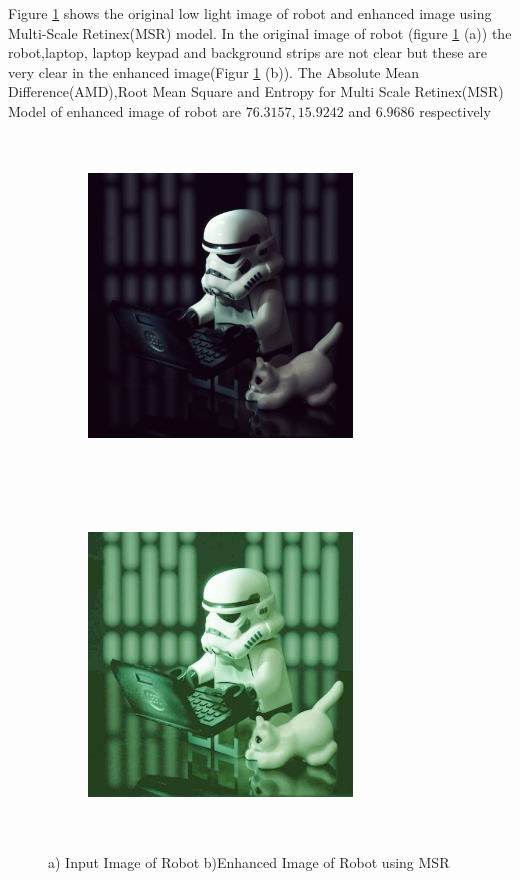Figure \ref{fig:msrRobot} shows the original low light image of robot and enhanced image using Multi-Scale Retinex(MSR) model. In the original image of robot (figure \ref{fig:msrRobot} (a))  the robot,laptop, laptop keypad and background strips are not clear but these are very clear in the enhanced image(Figur \ref{fig:msrRobot} (b)). The Absolute Mean Difference(AMD),Root Mean Square and Entropy for Multi Scale Retinex(MSR) Model of enhanced image of robot are $76.3157, 15.9242$ and $6.9686$ respectively      


\begin{figure}
	\begin{subfigure}{8cm}
		\centering    
    	\includegraphics[width=7cm,height=9cm,keepaspectratio]{images/ch5/robot_input.jpg}
    	\caption{} 
    \end{subfigure}
  	\begin{subfigure}{6cm}
  		\centering
  		\includegraphics[width=7cm,height=9cm,keepaspectratio]{images/ch5/robot_msr.jpg}
   		\caption{}
  	\end{subfigure}
  	\caption{a) Input Image of Robot b)Enhanced Image of Robot using MSR}
  	\label{fig:msrRobot}
\end{figure}

